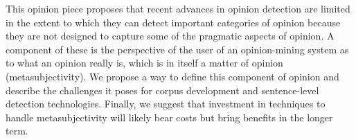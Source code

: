 This opinion piece proposes that recent advances in opinion detection are limited in the extent to which they can detect important categories of opinion
 because they are not designed to capture some of the pragmatic aspects of
 opinion.  A component of these is the perspective of the user of an
 opinion-mining system as to what an opinion really is, which is in itself a
 matter of opinion (metasubjectivity).  We propose a way to define this
 component of opinion and describe the challenges it poses for corpus
 development and sentence-level detection technologies. Finally, we
 suggest that investment in techniques to handle metasubjectivity will likely
 bear costs but bring benefits in the longer term.

